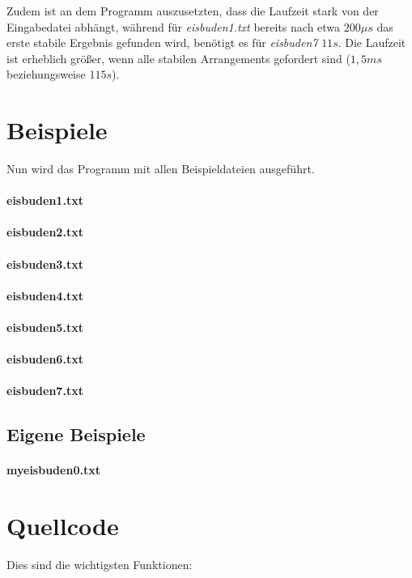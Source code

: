 \documentclass[a4paper,10pt,ngerman]{scrartcl}
\begin{document}
Zudem ist an dem Programm auszusetzten, dass die Laufzeit stark von der Eingabedatei abhängt, während für \textit{eisbuden1.txt} bereits nach etwa $200\mu s$ das erste stabile Ergebnis gefunden wird, benötigt es für \textit{eisbuden7} $11s$.
Die Laufzeit ist erheblich größer, wenn alle stabilen Arrangements gefordert sind ($1,5ms$ beziehungsweise $115s$).

\section{Beispiele}
Nun wird das Programm mit allen Beispieldateien ausgeführt.

\paragraph{eisbuden1.txt}

\paragraph{eisbuden2.txt}

\paragraph{eisbuden3.txt}

\paragraph{eisbuden4.txt}

\paragraph{eisbuden5.txt}

\paragraph{eisbuden6.txt}

\paragraph{eisbuden7.txt}

\subsection{Eigene Beispiele}

\paragraph{myeisbuden0.txt}

\section{Quellcode}
Dies sind die wichtigsten Funktionen:
\begin{lstlisting}
\end{lstlisting}
\end{document}
